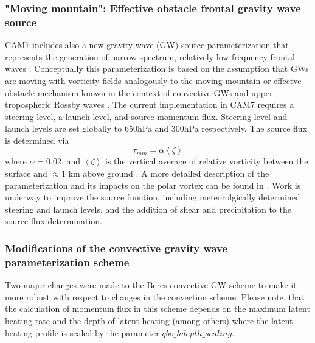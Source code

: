 \documentclass[draft]{agujournal2019}
\begin{document}
\subsubsection{"Moving mountain": Effective obstacle frontal gravity wave source}
CAM7 includes also a new gravity wave (GW) source parameterization that represents the generation of narrow-spectrum, relatively low-frequency frontal waves \cite{Bramberger_Bacmeister_2025}. 
Conceptually this parameterization is based on the assumption that GWs are moving with vorticity fields analogously to the moving mountain or effectve obstacle mechanism known in the context of convective GWs \cite{corcos2025observation} and upper tropospheric Rossby waves \cite{dornbrack2022stratospheric}. The current implementation in CAM7 requires a steering level, a launch level, and source momentum flux.  Steering level and launch levels are set globally to 650hPa and 300hPa respectively.  The source flux is determined via
\begin{equation}
\tau_{mm} = \alpha \left< \zeta \right>
\end{equation}
where $\alpha$$=$0.02, and $\left< \zeta \right>$ is the vertical average of relative vorticity between the surface and $\approx$1 km above ground . A more detailed description of the parameterization and its impacts on the polar vortex can be found in \cite{Bramberger_Bacmeister_2025}. Work is underway to improve the source function, including meteorolgically determined steering and launch levels, and the addition of shear and precipitation to the source flux determination.

\subsubsection{Modifications of the convective gravity wave parameterization scheme}
Two major changes were made to the Beres convective GW scheme \cite{Beres_etal_2004, Beres_etal_2005} to make it more robust with respect to changes in the convection scheme. Please note, that the calculation of momentum flux in this scheme depends on the maximum latent heating rate and the depth of latent heating (among others) where the latent heating profile is scaled by the parameter $qbo\_hdepth\_scaling$.
\end{document}
